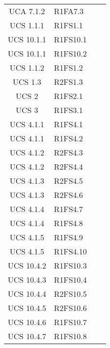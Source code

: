 {\begin{longtable}{ c C{4cm} c c}
UCA 7.1.2 & R1FA7.3\\

UCS 1.1.1 & R1FS1.1\\

UCS 10.1.1 & R1FS10.1\\


UCS 10.1.1 & R1FS10.2\\

UCS 1.1.2 & R1FS1.2\\

UCS 1.3 & R2FS1.3\\

UCS 2 & R1FS2.1\\

UCS 3 & R1FS3.1\\


UCS 4.1.1 & R1FS4.1\\

UCS 4.1.1 & R1FS4.2\\

UCS 4.1.2 & R2FS4.3\\

UCS 4.1.2 & R2FS4.4\\

UCS 4.1.3 & R2FS4.5\\

UCS 4.1.3 & R2FS4.6\\

UCS 4.1.4 & R1FS4.7\\

UCS 4.1.4 & R1FS4.8\\

UCS 4.1.5 & R1FS4.9\\

UCS 4.1.5 & R1FS4.10\\


UCS 10.4.2 & R1FS10.3\\

UCS 10.4.3 & R1FS10.4\\

UCS 10.4.4 & R2FS10.5\\

UCS 10.4.5 & R2FS10.6\\

UCS 10.4.6 & R1FS10.7\\

UCS 10.4.7 & R1FS10.8\\


\end{longtable}}
